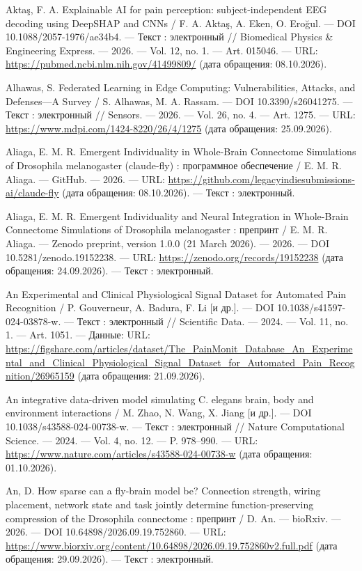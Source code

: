 \begin{list}{}{\setlength{\leftmargin}{10mm}\setlength{\labelwidth}{8mm}\setlength{\labelsep}{2mm}\setlength{\itemsep}{0pt}\setlength{\parsep}{0pt}\setlength{\topsep}{0pt}}
\item[28.] Aktaş, F. A. Explainable AI for pain perception: subject-independent EEG decoding using DeepSHAP and CNNs / F. A. Aktaş, A. Eken, O. Eroğul. — DOI 10.1088/2057-1976/ae34b4. — Текст : электронный // Biomedical Physics \& Engineering Express. — 2026. — Vol. 12, no. 1. — Art. 015046. — URL: \url{https://pubmed.ncbi.nlm.nih.gov/41499809/} (дата обращения: 08.10.2026).
\item[29.] Alhawas, S. Federated Learning in Edge Computing: Vulnerabilities, Attacks, and Defenses—A Survey / S. Alhawas, M. A. Rassam. — DOI 10.3390/s26041275. — Текст : электронный // Sensors. — 2026. — Vol. 26, no. 4. — Art. 1275. — URL: \url{https://www.mdpi.com/1424-8220/26/4/1275} (дата обращения: 25.09.2026).
\item[30.] Aliaga, E. M. R. Emergent Individuality in Whole-Brain Connectome Simulations of Drosophila melanogaster (claude-fly) : программное обеспечение / E. M. R. Aliaga. — GitHub. — 2026. — URL: \url{https://github.com/legacyindiesubmissions-ai/claude-fly} (дата обращения: 08.10.2026). — Текст : электронный.
\item[31.] Aliaga, E. M. R. Emergent Individuality and Neural Integration in Whole-Brain Connectome Simulations of Drosophila melanogaster : препринт / E. M. R. Aliaga. — Zenodo preprint, version 1.0.0 (21 March 2026). — 2026. — DOI 10.5281/zenodo.19152238. — URL: \url{https://zenodo.org/records/19152238} (дата обращения: 24.09.2026). — Текст : электронный.
\item[32.] An Experimental and Clinical Physiological Signal Dataset for Automated Pain Recognition / P. Gouverneur, A. Badura, F. Li [и др.]. — DOI 10.1038/s41597-024-03878-w. — Текст : электронный // Scientific Data. — 2024. — Vol. 11, no. 1. — Art. 1051. — Данные: URL: \url{https://figshare.com/articles/dataset/The\_PainMonit\_Database\_An\_Experimental\_and\_Clinical\_Physiological\_Signal\_Dataset\_for\_Automated\_Pain\_Recognition/26965159} (дата обращения: 21.09.2026).
\item[33.] An integrative data-driven model simulating C. elegans brain, body and environment interactions / M. Zhao, N. Wang, X. Jiang [и др.]. — DOI 10.1038/s43588-024-00738-w. — Текст : электронный // Nature Computational Science. — 2024. — Vol. 4, no. 12. — P. 978–990. — URL: \url{https://www.nature.com/articles/s43588-024-00738-w} (дата обращения: 01.10.2026).
\item[34.] An, D. How sparse can a fly-brain model be? Connection strength, wiring placement, network state and task jointly determine function-preserving compression of the Drosophila connectome : препринт / D. An. — bioRxiv. — 2026. — DOI 10.64898/2026.09.19.752860. — URL: \url{https://www.biorxiv.org/content/10.64898/2026.09.19.752860v2.full.pdf} (дата обращения: 29.09.2026). — Текст : электронный.

\end{list}
